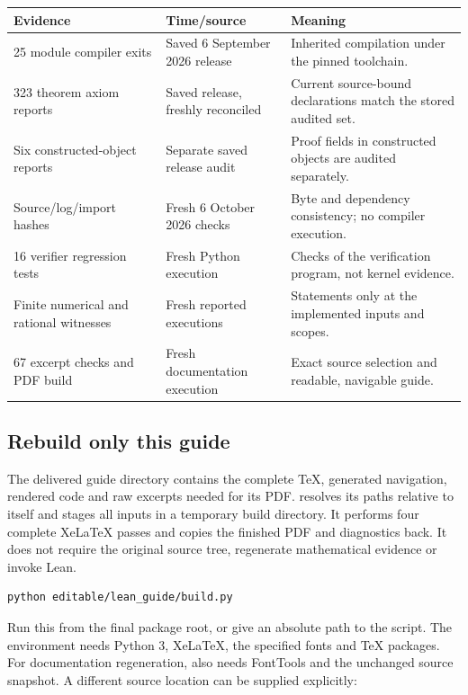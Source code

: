 \begin{longtable}{@{}p{.31\linewidth}p{.30\linewidth}p{.32\linewidth}@{}}
\toprule Evidence & Time/source & Meaning\\\midrule\endhead
25 module compiler exits & Saved 6 September 2026 release & Inherited compilation under the pinned toolchain.\\
323 theorem axiom reports & Saved release, freshly reconciled & Current source-bound declarations match the stored audited set.\\
Six constructed-object reports & Separate saved release audit & Proof fields in constructed objects are audited separately.\\
Source/log/import hashes & Fresh 6 October 2026 checks & Byte and dependency consistency; no compiler execution.\\
16 verifier regression tests & Fresh Python execution & Checks of the verification program, not kernel evidence.\\
Finite numerical and rational witnesses & Fresh reported executions & Statements only at the implemented inputs and scopes.\\
67 excerpt checks and PDF build & Fresh documentation execution & Exact source selection and readable, navigable guide.\\
\bottomrule\end{longtable}

\subsection{Rebuild only this guide}
The delivered guide directory contains the complete TeX, generated navigation, rendered code and raw excerpts needed for its PDF.  resolves its paths relative to itself and stages all inputs in a temporary build directory. It performs four complete XeLaTeX passes and copies the finished PDF and diagnostics back. It does not require the original source tree, regenerate mathematical evidence or invoke Lean.

\begin{Verbatim}[fontsize=\small,breaklines=true,breakanywhere=true]
python editable/lean_guide/build.py
\end{Verbatim}

Run this from the final package root, or give an absolute path to the script. The environment needs Python 3, XeLaTeX, the specified fonts and TeX packages. For documentation regeneration,  also needs FontTools and the unchanged source snapshot. A different source location can be supplied explicitly:

